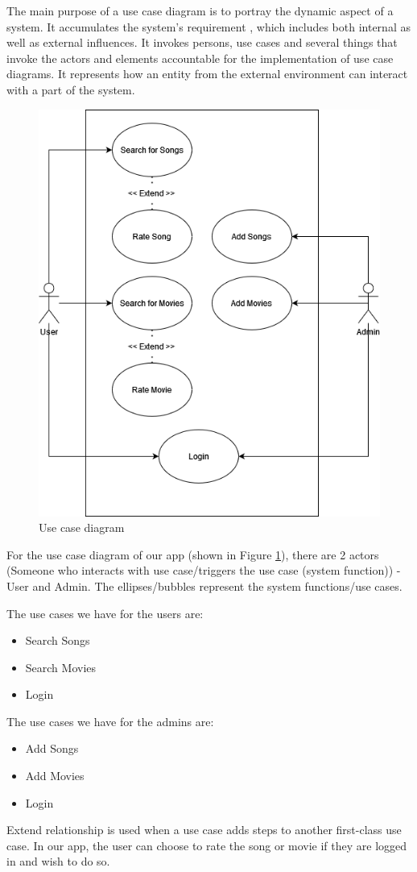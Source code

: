 The main purpose of a use case diagram is to portray the dynamic aspect of a system. It accumulates the system's requirement , which includes both internal as well as external influences. It invokes persons, use cases and several things that invoke the actors and elements accountable for the implementation of use  case diagrams. It represents how an entity from the external environment can interact with a part of the system.
\begin{figure}[H]
\centering
\includegraphics[width=\textwidth]{imgs/use_case.png}
\caption{Use case diagram}
\label{fig: usecase}
\end{figure}


For the use case diagram of our app (shown in Figure \ref{fig: usecase}), there are 2 actors (Someone who interacts with use case/triggers  the use case (system function)) - User and Admin. The ellipses/bubbles represent the system functions/use cases. \newline

The use cases we have for the users are:
\begin{itemize}
\item Search Songs
\item Search Movies
\item Login
\end{itemize}

The use cases we have for the admins are:
\begin{itemize}
\item Add Songs
\item Add Movies
\item Login
\end{itemize}

Extend relationship is used when a use case adds steps to another first-class use case. In our app, the user can choose to rate the song or movie if they are logged in and wish to do so. 
